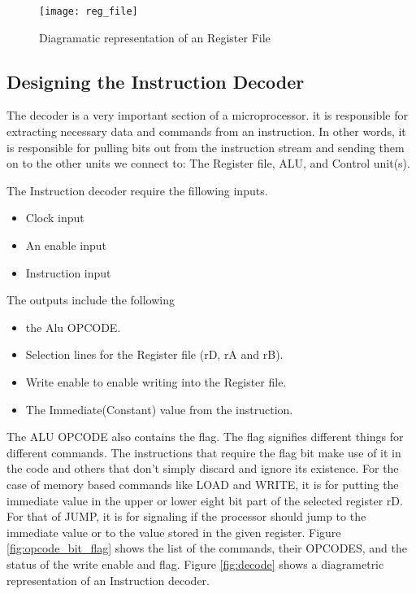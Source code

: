\begin{figure}[p]

\texttt{[image: reg\_file]}
\centering
\caption{Diagramatic representation of an Register File}
\centering
\label{fig:decoder}
\end{figure}







\subsection{Designing the Instruction Decoder}
The decoder is a very important section of a microprocessor. it is responsible for extracting necessary data and commands from an instruction. In other words, it is responsible for pulling bits out from the instruction stream and sending them on to the other units we connect to: The Register file, ALU, and Control unit(s).

The Instruction decoder require the fillowing inputs.
\begin{itemize}
\item Clock input
\item An enable input
\item Instruction input
\end{itemize} 

The outputs include the following 
\begin{itemize}
\item the Alu OPCODE.
\item Selection lines for the Register file (rD, rA and rB).
\item Write enable to enable writing into the Register file.
\item The Immediate(Constant) value from the instruction.
\end{itemize}

The ALU OPCODE also contains the flag. The flag signifies different things for different commands. The instructions that require the flag bit make use of it in the code and others that don't simply discard and ignore its existence. For the case of memory based commands like LOAD and WRITE, it is for putting the immediate value in the upper or lower eight bit part of the selected register rD. For that of JUMP, it is for signaling if the processor should jump to the immediate value or to the value stored in the given register. Figure  \ref{fig:opcode_bit_flag} shows the list of the commands, their OPCODES, and the status of the write enable and flag. Figure \ref{fig:decode} shows a diagrametric representation of an Instruction decoder.



